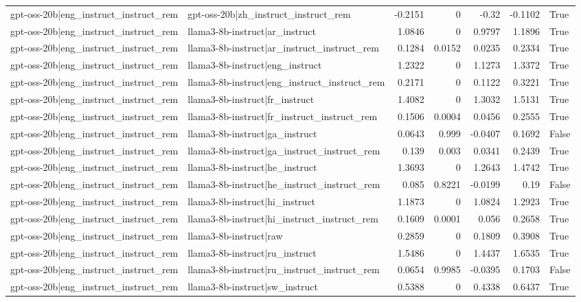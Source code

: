 \begin{table}
\begin{tabular}{l l r r r r l}
gpt-oss-20b|eng_instruct_instruct_rem & gpt-oss-20b|zh_instruct_instruct_rem & -0.2151 & 0 & -0.32 & -0.1102 & True \\
gpt-oss-20b|eng_instruct_instruct_rem & llama3-8b-instruct|ar_instruct & 1.0846 & 0 & 0.9797 & 1.1896 & True \\
gpt-oss-20b|eng_instruct_instruct_rem & llama3-8b-instruct|ar_instruct_instruct_rem & 0.1284 & 0.0152 & 0.0235 & 0.2334 & True \\
gpt-oss-20b|eng_instruct_instruct_rem & llama3-8b-instruct|eng_instruct & 1.2322 & 0 & 1.1273 & 1.3372 & True \\
gpt-oss-20b|eng_instruct_instruct_rem & llama3-8b-instruct|eng_instruct_instruct_rem & 0.2171 & 0 & 0.1122 & 0.3221 & True \\
gpt-oss-20b|eng_instruct_instruct_rem & llama3-8b-instruct|fr_instruct & 1.4082 & 0 & 1.3032 & 1.5131 & True \\
gpt-oss-20b|eng_instruct_instruct_rem & llama3-8b-instruct|fr_instruct_instruct_rem & 0.1506 & 0.0004 & 0.0456 & 0.2555 & True \\
gpt-oss-20b|eng_instruct_instruct_rem & llama3-8b-instruct|ga_instruct & 0.0643 & 0.999 & -0.0407 & 0.1692 & False \\
gpt-oss-20b|eng_instruct_instruct_rem & llama3-8b-instruct|ga_instruct_instruct_rem & 0.139 & 0.003 & 0.0341 & 0.2439 & True \\
gpt-oss-20b|eng_instruct_instruct_rem & llama3-8b-instruct|he_instruct & 1.3693 & 0 & 1.2643 & 1.4742 & True \\
gpt-oss-20b|eng_instruct_instruct_rem & llama3-8b-instruct|he_instruct_instruct_rem & 0.085 & 0.8221 & -0.0199 & 0.19 & False \\
gpt-oss-20b|eng_instruct_instruct_rem & llama3-8b-instruct|hi_instruct & 1.1873 & 0 & 1.0824 & 1.2923 & True \\
gpt-oss-20b|eng_instruct_instruct_rem & llama3-8b-instruct|hi_instruct_instruct_rem & 0.1609 & 0.0001 & 0.056 & 0.2658 & True \\
gpt-oss-20b|eng_instruct_instruct_rem & llama3-8b-instruct|raw & 0.2859 & 0 & 0.1809 & 0.3908 & True \\
gpt-oss-20b|eng_instruct_instruct_rem & llama3-8b-instruct|ru_instruct & 1.5486 & 0 & 1.4437 & 1.6535 & True \\
gpt-oss-20b|eng_instruct_instruct_rem & llama3-8b-instruct|ru_instruct_instruct_rem & 0.0654 & 0.9985 & -0.0395 & 0.1703 & False \\
gpt-oss-20b|eng_instruct_instruct_rem & llama3-8b-instruct|sw_instruct & 0.5388 & 0 & 0.4338 & 0.6437 & True \\

\end{tabular}
\end{table}
